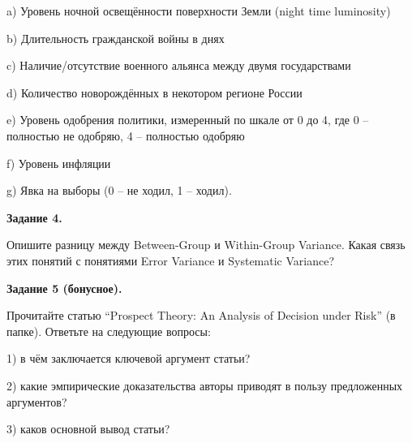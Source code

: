 \documentclass[12pt]{article}
\begin{document}
a) Уровень ночной освещённости поверхности Земли (night time luminosity)

b) Длительность гражданской войны в днях

c) Наличие/отсутствие военного альянса между двумя государствами

d) Количество новорождённых в некотором регионе России

e) Уровень одобрения политики,  измеренный по шкале от 0 до 4,  где 0 -- полностью не одобряю,  4 -- полностью одобряю

f) Уровень инфляции

g) Явка на выборы (0 -- не ходил,  1 -- ходил).

\textbf{Задание 4.}

Опишите разницу между Between-Group и Within-Group Variance.  Какая связь этих понятий с понятиями Error Variance и Systematic Variance? 

\textbf{Задание 5 (бонусное).}

Прочитайте статью ``Prospect Theory: An Analysis of Decision under Risk'' (в папке).  Ответьте на следующие вопросы:

1) в чём заключается ключевой аргумент статьи? 

2) какие эмпирические доказательства авторы приводят в пользу предложенных аргументов? 

3) каков основной вывод статьи? 
\end{document}
